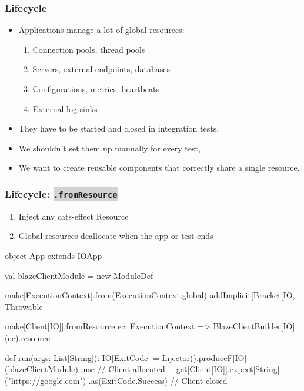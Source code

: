 \documentclass[usenames,dvipsnames]{beamer}
\newcommand{\code}[1]{\colorbox{lightgray}{\texttt{#1}}}
\begin{document}
\begin{frame}
\frametitle{Lifecycle}
  \begin{itemize}
    \item Applications manage a lot of global resources:
      \begin{enumerate}
      \item Connection pools, thread pools
      \item Servers, external endpoints, databases
      \item Configurations, metrics, heartbeats
      \item External log sinks
      \end{enumerate}
    \item They have to be started and closed in integration tests,
    \item We shouldn't set them up manually for every test,
    \item We want to create reusable components that correctly share a single resource.
  \end{itemize}
\end{frame}

\begin{frame}[fragile]
\frametitle{Lifecycle: \code{.fromResource}}
  \begin{enumerate}
    \item Inject any cats-effect Resource
    \item Global resources deallocate when the app or test ends
  \end{enumerate}

  \begin{scalacode}
object App extends IOApp {
  val blazeClientModule = new ModuleDef {
    make[ExecutionContext].from(ExecutionContext.global)
    addImplicit[Bracket[IO, Throwable]]

    make[Client[IO]].fromResource { ec: ExecutionContext =>
      BlazeClientBuilder[IO](ec).resource
  }}

  def run(args: List[String]): IO[ExitCode] =
    Injector().produceF[IO](blazeClientModule)
    .use { // Client allocated
      _.get[Client[IO]].expect[String]("https://google.com")
    }.as(ExitCode.Success) // Client closed
}
  \end{scalacode}
\end{frame}
\end{document}
